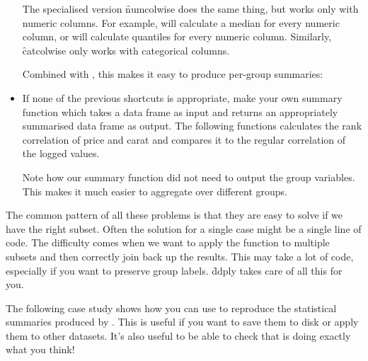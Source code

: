 \begin{itemize}
   The specialised version \f{numcolwise} does the same thing, but works only with numeric columns.  For example,  will calculate a median for every numeric column, or  will calculate quantiles for every numeric column.  Similarly, \f{catcolwise} only works with categorical columns.
  
    
  
  Combined with , this makes it easy to produce per-group summaries:
  
    
  
  \item If none of the previous shortcuts is appropriate, make your own summary function which takes a data frame as input and returns an appropriately summarised data frame as output.  The following functions calculates the rank correlation of price and carat and compares it to the regular correlation of the logged values.
  
    
  
  Note how our summary function did not need to output the group variables.  This makes it much easier to aggregate over different groups.
\end{itemize}

The common pattern of all these problems is that they are easy to solve if we have the right subset. Often the solution for a single case might be a single line of code. The difficulty comes when we want to apply the function to multiple subsets and then correctly join back up the results. This may take a lot of code, especially if you want to preserve group labels. \f{ddply} takes care of all this for you.

The following case study shows how you can use  to reproduce the statistical summaries produced by \ggplot.  This is useful if you want to save them to disk or apply them to other datasets.  It's also useful to be able to check that \ggplot is doing exactly what you think!

